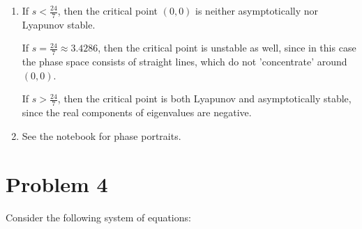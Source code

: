 \documentclass[12pt,letterpaper]{article}
\begin{document}
\begin{enumerate}[label=(\alph*)]
	\item

	      If $s < \frac{24}{7}$, then the critical point $(0,0)$ is neither asymptotically nor Lyapunov stable.

	      If $s = \frac{24}{7} \approx 3.4286$, then the critical point is unstable as well, since in this case the phase space consists of straight lines, which do not 'concentrate' around $(0,0)$.

	      If $s > \frac{24}{7}$, then the critical point is both Lyapunov and asymptotically stable, since the real components of eigenvalues are negative.

	\item See the notebook for phase portraits.
\end{enumerate}

\section*{Problem 4}
Consider the following system of equations:
\end{document}

